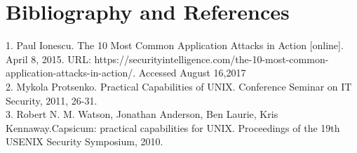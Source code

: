 \documentclass{article}
\begin{document}
\section{Bibliography and References}
 1.	Paul Ionescu. The 10 Most Common Application Attacks in Action [online]. April 8, 2015. URL: https://securityintelligence.com/the-10-most-common-application-attacks-in-action/. Accessed August 16,2017 \\
 2.	Mykola Protsenko. Practical Capabilities of UNIX. Conference Seminar on IT Security, 2011, 26-31.\\
3.	Robert N. M. Watson, Jonathan Anderson, Ben Laurie, Kris Kennaway.Capsicum: practical capabilities for UNIX. Proceedings of the 19th USENIX Security Symposium, 2010.\\

 
 
\end{document}
